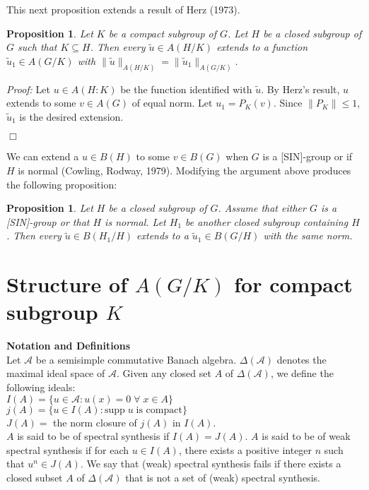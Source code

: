 \documentclass[12 pt]{article}
\newcommand\done{\begin{flushright}$\Box$\end{flushright}}
\newtheorem{prop}[defn]{Proposition}
\begin{document}
This next proposition extends a result of Herz (1973).

\begin{prop}
Let $K$ be a compact subgroup of $G$.  Let $H$ be a closed subgroup of $G$ such that $K\subseteq H$.
Then every $\tilde{u} \in A(H/K)$ extends to a function $\tilde{u}_1 \in A(G/K)$ with
$\|\tilde{u}\|_{A(H/K)} = \|\tilde{u}_1\|_{A(G/K)}$.
\end{prop}
{\it Proof:}
Let $u\in A(H:K)$ be the function identified with $\tilde{u}$.  By Herz's result,
$u$ extends to some $v\in A(G)$ of equal norm.  Let $u_1 = P_K (v)$.
Since $\|P_K \| \leq 1$, $\tilde{u}_1$ is the desired extension.\done

We can extend a $u \in B(H)$ to some $v\in B(G)$ when $G$ is a [SIN]-group
or if $H$ is normal (Cowling, Rodway, 1979).  Modifying the argument
above produces the following proposition:

\begin{prop}
Let $H$ be a closed subgroup of $G$.  Assume that either $G$ is a [SIN]-group or that $H$ is normal.
Let $H_1$ be another closed subgroup containing $H$.  Then every $\tilde{u}\in B(H_1/H)$ extends to a 
$\tilde{u}_1 \in B(G/H)$ with the same norm.
\end{prop}


\section{Structure of $A(G/K)$ for compact subgroup $K$}
\textbf{Notation and Definitions}\\
Let $\mathcal{A}$ be a semisimple commutative Banach algebra.  $\Delta (\mathcal{A})$ denotes
the maximal ideal space of $\mathcal{A}$.  Given any closed set $A$ of $\Delta (\mathcal{A})$,
we define the following ideals:\\
$I(A) = \{u\in \mathcal{A}: u(x) = 0\;\forall\;x\in A\}$\\
$j(A) = \{u\in I(A): \text{supp}\;u\;\text{is compact} \}$\\
$J(A)=$ the norm closure of $j(A)$ in $I(A)$.\\ 
$A$ is said to be of spectral synthesis if $I(A) = J(A)$.
$A$ is said to be of weak spectral synthesis if for each $u\in I(A)$, there exists a positive integer $n$
such that $u^n \in J(A)$.  We say that (weak) spectral synthesis fails if there exists a closed subset $A$
of $\Delta(\mathcal{A})$ that is not a set of (weak) spectral synthesis.
\end{document}
